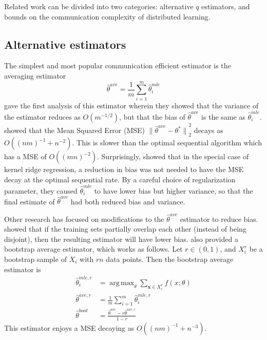 \documentclass[twoside]{article}
\DeclareMathOperator*{\argmin}{arg\,min}
\DeclareMathOperator*{\argmax}{arg\,max}
\newcommand{\x}{\mathbf{x}}
\newcommand{\w}{\theta}
\newcommand{\wave}{\hat\w^{ave}}
\newcommand{\waver}{\hat\w^{ave,r}}
\newcommand{\wboot}{\hat\w^{boot}}
\newcommand{\wmle}{\hat\w^{mle}}
\newcommand{\wmler}{\hat\w^{mle,r}}
\newcommand{\wstar}{{\w^{*}}}
\newcommand{\ltwo}[1]{{\lVert {#1} \rVert}_2}
\begin{document}
Related work can be divided into two categories:
alternative $q$ estimators,
and bounds on the communication complexity of distributed learning.

\subsection{Alternative estimators}
The simplest and most popular communication efficient estimator is the averaging estimator
\begin{equation}
\wave = \frac{1}{m}\sum_{i=1}^m \wmle_i
\end{equation}
\cite{mcdonald2009efficient}
 gave the first analysis of this estimator wherein they showed that the variance of the estimator reduces as $O(m^{-1/2})$, but that the bias of $\wave$ is the same as $\wmle_i$.
\cite{zhang2012communication} showed that the Mean Squared Error (MSE) $\ltwo{\wave-\wstar}^2$ decays as $O((nm)^{-1} + n^{-2})$.
This is slower than the optimal sequential algorithm which has a MSE of $O((mn)^{-2})$.
Surprisingly, \cite{zhang2013divide} showed that in the special case of kernel ridge regression, a reduction in bias was not needed to have the MSE decay at the optimal sequential rate.
By a careful choice of regularization parameter, they caused $\wmle_i$ to have lower bias but higher variance, so that the final estimate of $\wave$ had both reduced bias and variance.

Other research has focused on modifications to the $\wave$ estimator to reduce bias.
\cite{zinkevich2010parallelized} showed that if the training sets partially overlap each other (instead of being disjoint), then the resulting estimator will have lower bias.
\cite{zhang2012communication} also provided a bootstrap average estimator,
which works as follows.
Let $r\in(0,1)$, and $X_i^r$ be a bootstrap sample of $X_i$ with $rn$ data points.
Then the bootstrap average estimator is
\begin{equation}
\begin{aligned}
\wmler_i &= \argmax_\w \sum_{\x\in X_i^r} f(x;\w)
\\
\waver &= \frac{1}{m}\sum_{i=1}^m \wmler_i
\\
\wboot & = \frac{\wave-r\waver}{1-r}
\end{aligned}
\end{equation}
This estimator enjoys a MSE decaying as $O((nm)^{-1}+n^{-3})$.

\end{document}
